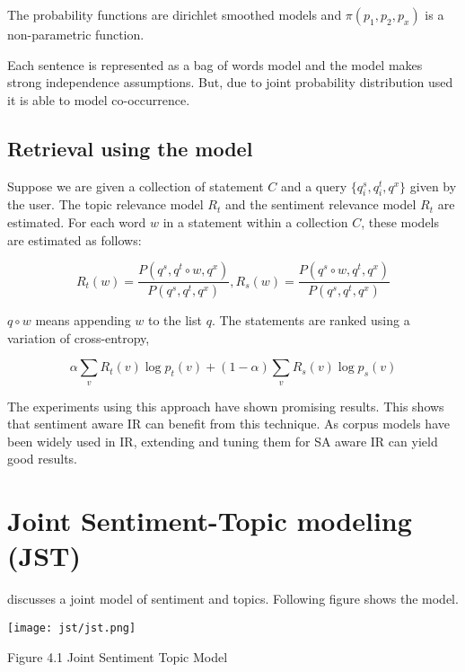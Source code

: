 The probability functions are dirichlet smoothed models and \(\pi(p_1,p_2,p_x)\) is a non-parametric function. 

Each sentence is represented as a bag of words model and the model makes strong independence assumptions. But, due to joint
probability distribution used it is able to model co-occurrence. 

\subsection*{Retrieval using the model}

Suppose we are given a collection of statement \(C\) and a query \(\{q_i^s,q_i^t,q^x\}\) given by the user. The topic relevance model
\(R_t\) and the sentiment relevance model \(R_t\) are estimated. For each word \(w\) in a statement within a collection \(C\), these
models are estimated as follows:


\begin{equation}
R_t(w) = \frac{P(q^s,q^t\circ w,q^x)}{P(q^s,q^t,q^x)} , R_s(w) = \frac{P(q^s \circ w,q^t,q^x)}{P(q^s,q^t,q^x)} 
\end{equation}

\(q \circ w\) means appending \(w\) to the list \(q\). The statements are ranked using a variation of cross-entropy,

\begin{equation}
 \alpha \sum_v R_t(v) \log p_t (v) + (1-\alpha) \sum_v R_s(v) \log p_s(v)
\end{equation}

\par

The experiments using this approach have shown promising results. This shows that sentiment aware IR can benefit from this technique.
As corpus models have been widely used in IR, extending and tuning them for SA aware IR can yield good results. 


\section{Joint Sentiment-Topic modeling (JST)}

\citep*{lin2009joint} discusses a joint model of sentiment and topics. Following figure shows the model.

\texttt{[image: jst/jst.png]} 
\begin{center}
 Figure 4.1 Joint Sentiment Topic Model
\end{center}

